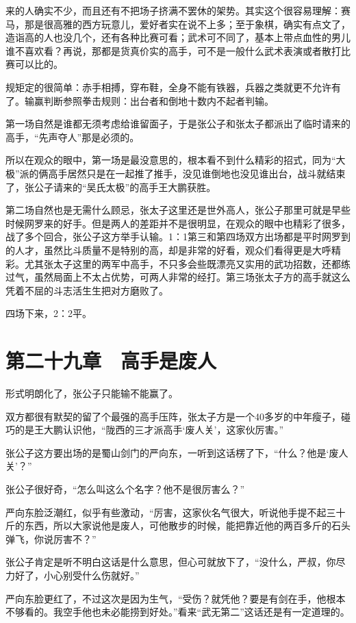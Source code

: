 来的人确实不少，而且还有不把场子挤满不罢休的架势。其实这个很容易理解：赛马，那是很高雅的西方玩意儿，爱好者实在说不上多；至于象棋，确实有点文了，造诣高的人也没几个，还有各种比赛可看；武术可不同了，基本上带点血性的男儿谁不喜欢看？再说，那都是货真价实的高手，可不是一般什么武术表演或者散打比赛可以比的。

规矩定的很简单：赤手相搏，穿布鞋，全身不能有铁器，兵器之类就更不允许有了。输赢判断参照拳击规则：出台者和倒地十数内不起者判输。

第一场自然是谁都无须考虑给谁留面子，于是张公子和张太子都派出了临时请来的高手，“先声夺人”那是必须的。

所以在观众的眼中，第一场是最没意思的，根本看不到什么精彩的招式，同为“大极”派的俩高手居然只是在一起推了推手，没见谁倒地也没见谁出台，战斗就结束了，张公子请来的“吴氏太极”的高手王大鹏获胜。

第二场自然也是无需什么顾忌，张太子这里还是世外高人，张公子那里可就是早些时候网罗来的好手。但是两人的差距并不是很明显，在观众的眼中也精彩了很多，战了多个回合，张公子这方举手认输。1：1第三和第四场双方出场都是平时网罗到的人才，虽然比斗质量不是特别的高，却是非常的好看，观众们看得更是大呼精彩。尤其张太子这里的两军中高手，不只多会些既漂亮又实用的武功招数，还都练过气，虽然局面上不太占优势，可两人非常的经打。第三场张太子方的高手就这么凭着不屈的斗志活生生把对方磨败了。

四场下来，2：2平。

\section{第二十九章　高手是废人}

形式明朗化了，张公子只能输不能赢了。

双方都很有默契的留了个最强的高手压阵，张太子方是一个40多岁的中年瘦子，碰巧的是王大鹏认识他，“陇西的三才派高手‘废人关’，这家伙厉害。”

张公子这方要出场的是蜀山剑门的严向东，一听到这话楞了下，“什么？他是‘废人关’？”

张公子很好奇，“怎么叫这么个名字？他不是很厉害么？”

严向东脸泛潮红，似乎有些激动，“厉害，这家伙名气很大，听说他手提不起三十斤的东西，所以大家说他是废人，可他散步的时候，能把靠近他的两百多斤的石头弹飞，你说厉害不？”

张公子肯定是听不明白这话是什么意思，但心可就放下了，“没什么，严叔，你尽力好了，小心别受什么伤就好。”

严向东脸更红了，不过这次是因为生气，“受伤？就凭他？要是有剑在手，他根本不够看的。我空手他也未必能捞到好处。”看来“武无第二”这话还是有一定道理的。

